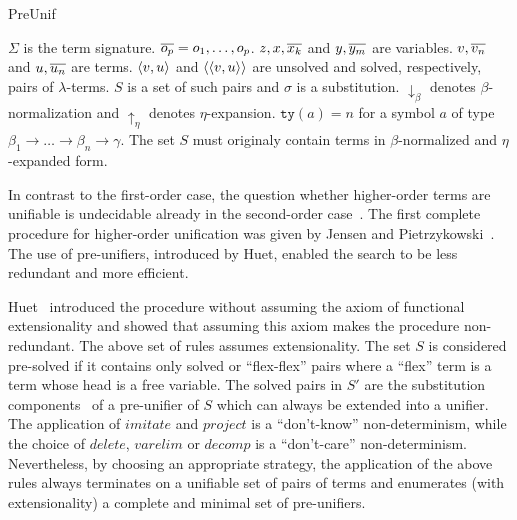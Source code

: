 \begin{entry}{PreUnif}
\begin{clarifications}
  $\Sigma$ is the term signature. $\overline{o_{p}} = o_1,\ldots,o_{p}$. $z,x,\overline{x_{k}}$ and $y,\overline{y_{m}}$ are variables.
  $v,\overline{v_{n}}$ and $u,\overline{u_{n}}$ are terms.
  $\langle v, u\rangle$ and $\langle\langle v, u\rangle\rangle$ are unsolved and solved, respectively, pairs of $\lambda$-terms.
  $S$ is a set of such pairs and $\sigma$ is a substitution.
  $\downarrow_\beta$ denotes $\beta$-normalization and $\uparrow_\eta$ denotes $\eta$-expansion.
  $\texttt{ty}(a) = n$ for a symbol $a$ of type $\beta_1\rightarrow\ldots\rightarrow \beta_n\rightarrow \gamma$.
  The set $S$ must originaly contain terms in $\beta$-normalized and $\eta$-expanded form.
\end{clarifications}

\begin{history}
   In contrast to the first-order case,
   the question whether higher-order terms are unifiable is
   undecidable already in the second-order case~\cite{goldfarb81tcs}.
   The first complete procedure for higher-order unification was given by
   Jensen and Pietrzykowski~\cite{jensen76tcs}.
   The use of pre-unifiers, introduced by Huet, enabled the search to
   be less redundant and more efficient.
\end{history}

\begin{technicalities}
  Huet~\cite{huet75tcs} introduced the procedure without assuming the axiom of
  functional extensionality and showed that assuming this axiom makes the
  procedure non-redundant.  The above set of rules assumes extensionality.  The
  set $S$ is considered pre-solved if it contains only solved or ``flex-flex''
  pairs where a ``flex'' term is a term whose head is a free variable.  The
  solved pairs in $S'$ are the substitution components~\cite{Robinson1965JACM}
  of a pre-unifier of $S$ which can always be extended into a unifier.  The
  application of $\mathit{imitate}$ and $\mathit{project}$ is a ``don't-know''
  non-determinism, while the choice of $\mathit{delete}$, $\mathit{varelim}$ or
  $\mathit{decomp}$ is a ``don't-care'' non-determinism.  Nevertheless, by
  choosing an appropriate strategy, the application of the above rules always
  terminates on a unifiable set of pairs of terms and enumerates (with
  extensionality) a complete and minimal set of pre-unifiers.
\end{technicalities}

\end{entry}
